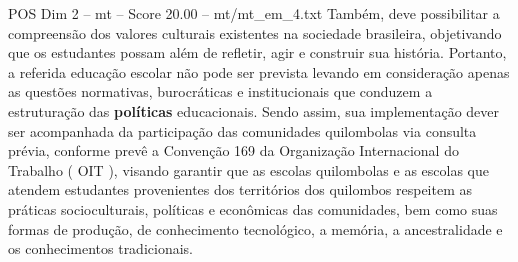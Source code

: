 \begin{textsample}{POS Dim 2 – mt – Score 20.00 – mt/mt\_em\_4.txt}
Também, deve possibilitar a compreensão dos valores culturais existentes na sociedade brasileira, objetivando que os estudantes possam além de refletir, agir e construir sua história.
Portanto, a referida educação escolar não pode ser prevista levando em consideração apenas as questões normativas, burocráticas e institucionais que conduzem a estruturação das \textbf{políticas} educacionais.
Sendo assim, sua implementação dever ser acompanhada da participação das comunidades quilombolas via consulta prévia, conforme prevê a Convenção 169 da Organização Internacional do Trabalho ( OIT ), visando garantir que as escolas quilombolas e as escolas que atendem estudantes provenientes dos territórios dos quilombos respeitem as práticas socioculturais, políticas e econômicas das comunidades, bem como suas formas de produção, de conhecimento tecnológico, a memória, a ancestralidade e os conhecimentos tradicionais.

\end{textsample}
